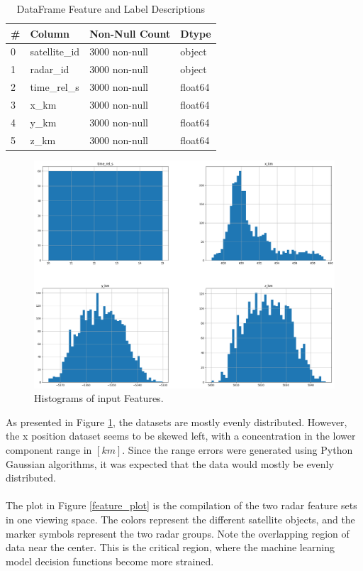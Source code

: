 \documentclass[./report_entry.tex]{subfiles}
\begin{document}
    \begin{table}[]
        \centering
        \caption{DataFrame Feature and Label Descriptions}
        \begin{tabular}{l|lll}
            \hline
        \# & Column        & Non-Null Count & Dtype   \\ \hline
        0  & satellite\_id & 3000 non-null  & object  \\
        1  & radar\_id     & 3000 non-null  & object  \\
        2  & time\_rel\_s  & 3000 non-null  & float64 \\
        3  & x\_km         & 3000 non-null  & float64 \\
        4  & y\_km         & 3000 non-null  & float64 \\
        5  & z\_km         & 3000 non-null  & float64 \\ \hline
        \end{tabular}
        \label{features}
    \end{table}
    \clearpage
    \begin{figure}[!htbp]
        \centering
        \includegraphics[scale=0.43]{../graphics/pre_proc.png}
        \caption{Histograms of input Features.}
        \label{hist}
    \end{figure}

    \noindent As presented in Figure \ref{hist}, the datasets are mostly evenly distributed.
    However, the x position dataset seems to be skewed left, with a concentration in the 
    lower component range in $[km]$.  Since the range errors were generated using Python Gaussian algorithms,
    it was expected that the data would mostly be evenly distributed.
    \\ \\
    \noindent The plot in Figure \ref{feature_plot} is the compilation of the two radar feature sets in one viewing space.
    The colors represent the different satellite objects, and the marker symbols represent the two
    radar groups.  Note the overlapping region of data near the center.  This is the critical region, where
    the machine learning model decision functions become more strained.
\end{document}
